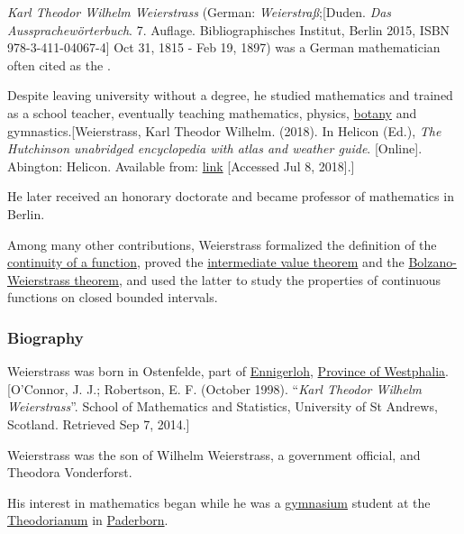 \documentclass{article}
\begin{document}
\textit{Karl Theodor Wilhelm Weierstrass} (German: \textit{Weierstraß};[Duden. \textit{Das Aussprachewörterbuch}. 7. Auflage. Bibliographisches Institut, Berlin 2015, ISBN 978-3-411-04067-4] Oct 31, 1815 - Feb 19, 1897) was a German mathematician often cited as the .

Despite leaving university without a degree, he studied mathematics and trained as a school teacher, eventually teaching mathematics, physics, \href{https://en.wikipedia.org/wiki/Botany}{botany} and gymnastics.[Weierstrass, Karl Theodor Wilhelm. (2018). In Helicon (Ed.), \textit{The Hutchinson unabridged encyclopedia with atlas and weather guide}. [Online]. Abington: Helicon. Available from: \href{http://libezproxy.open.ac.uk/login?url=https://search.credoreference.com/content/entry/heliconhe/weierstrass_karl_theodor_wilhelm/0?institutionId=292}{link} [Accessed Jul 8, 2018].]

He later received an honorary doctorate and became professor of mathematics in Berlin.

%
Among many other contributions, Weierstrass formalized the definition of the \href{https://en.wikipedia.org/wiki/Continuous_function}{continuity of a function}, proved the \href{https://en.wikipedia.org/wiki/Intermediate_value_theorem}{intermediate value theorem} and the \href{https://en.wikipedia.org/wiki/Bolzano-Weierstrass_theorem}{Bolzano-Weierstrass theorem}, and used the latter to study the properties of continuous functions on closed bounded intervals.

\subsubsection{Biography}
Weierstrass was born in Ostenfelde, part of \href{https://en.wikipedia.org/wiki/Ennigerloh}{Ennigerloh}, \href{https://en.wikipedia.org/wiki/Province_of_Westphalia}{Province of Westphalia}.[O'Connor, J. J.; Robertson, E. F. (October 1998). ``\textit{Karl Theodor Wilhelm Weierstrass}''. School of Mathematics and Statistics, University of St Andrews, Scotland. Retrieved Sep 7, 2014.]

%
Weierstrass was the son of Wilhelm Weierstrass, a government official, and Theodora Vonderforst.

His interest in mathematics began while he was a \href{https://en.wikipedia.org/wiki/Gymnasium_(Germany)}{gymnasium} student at the \href{https://en.wikipedia.org/wiki/Gymnasium_Theodorianum}{Theodorianum} in \href{https://en.wikipedia.org/wiki/Paderborn}{Paderborn}.
\end{document}
